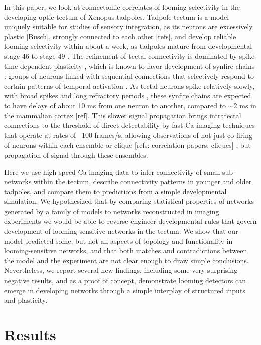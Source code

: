 \documentclass{article}
\begin{document}
In this paper, we look at connectomic correlates of looming selectivity in the developing optic tectum of Xenopus tadpoles. Tadpole tectum is a model uniquely suitable for studies of sensory integration, as its neurons are excessively plastic \citep{pratt2007intrinsic}[Busch], strongly connected to each other \citep{james2015}[refs], and develop reliable looming selectivity within about a week, as tadpoles mature from developmental stage 46 to stage 49 \citep{dong2009,khakhalin2014}. The refinement of tectal connectivity is dominated by spike-time-dependent plasticity \citep{zhang1998stdp,mu2006stdp}, which is known to favor development of synfire chains \citep{zheng2014synfire}: groups of neurons linked with sequential connections that selectively respond to certain patterns of temporal activation \citep{clopath2010stdpcoding}. As  tectal neurons spike relatively slowly, with broad spikes and long refractory periods \citep{ciarleglio2015,jang2016}, these synfire chains are expected to have delays of about 10 ms from one neuron to another, compared to $\sim$2 ms in the mammalian cortex [ref]. This slower signal propagation brings intratectal connections to the threshold of direct detectability by fast Ca imaging techniques that operate at rates of ~100 frames/s, allowing observations of not just co-firing of neurons within each ensemble or clique [refs:  correlation papers, cliques] \citep{avitan2017spontaneous}, but propagation of signal through these ensembles.

Here we use high-speed Ca imaging data to infer connectivity of small sub-networks within the tectum, describe connectivity patterns in younger and older tadpoles, and compare them to predictions from a simple developmental simulation. We hypothesized that by comparing statistical properties of networks generated by a family of models to networks reconstructed in imaging experiments we would be able to reverse-engineer developmental rules that govern development of looming-sensitive networks in the tectum. We show that our model predicted some, but not all aspects of topology and functionality in looming-sensitive networks, and that both matches and contradictions between the model and the experiment are not clear enough to draw simple conclusions. Nevertheless, we report several new findings, including some very surprising negative results, and as a proof of concept, demonstrate looming detectors can emerge in developing networks through a simple interplay of structured inputs and plasticity.

\section*{Results}
\end{document}
